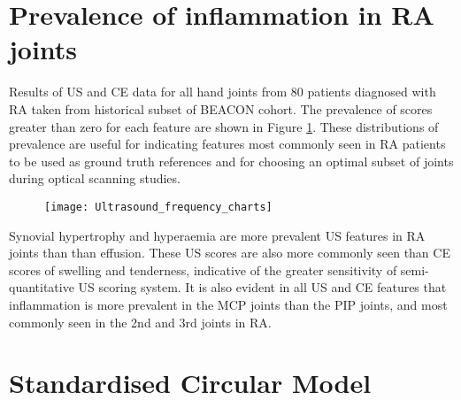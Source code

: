 \documentclass[twoside]{bhamthesis}
\theoremstyle{definition}
\begin{document}
\begin{comment}
WRITE THIS UP IN APPENDIX!
sigma 1 0.85* FWHM.

https://brainder.org/2011/08/20/gaussian-kernels-convert-fwhm-to-sigma/

FWHM= 2.355*sigma

sigma = 1/(0.85*2.355) = 0.4996mm 

This equals 0.63mm per pixel.

0.4996/0.63 = 0.7930 std in pix.

\begin{figure}[!ht]
\centering
  \texttt{[image: block\_phantom\_image]}
  \label{fig:test1}
\end{figure}


\end{comment}

\section{Prevalence of inflammation in RA joints}

\label{appendix:Prevalence_of_inflammation_in_RA_joints}

Results of US and CE data for all hand joints from 80 patients diagnosed with RA taken from historical subset of BEACON cohort. The prevalence of scores greater than zero for each feature are shown in Figure \ref{fig:Ultrasound_frequency_charts}. These distributions of prevalence are useful for indicating features most commonly seen in RA patients to be used as ground truth references and for choosing an optimal subset of joints during optical scanning studies.

\begin{figure}[!ht]
\centering
  \texttt{[image: Ultrasound\_frequency\_charts]}
  \label{fig:Ultrasound_frequency_charts}
\end{figure}

Synovial hypertrophy and hyperaemia are more prevalent US features in RA joints than than effusion. These US scores are also more commonly seen than CE scores of swelling and tenderness, indicative of the greater sensitivity of semi-quantitative US scoring system. It is also evident in all US and CE features that inflammation is more prevalent in the MCP joints than the PIP joints, and most commonly seen in the 2nd and 3rd joints in RA.


\section{Standardised Circular Model} 
\end{document}
